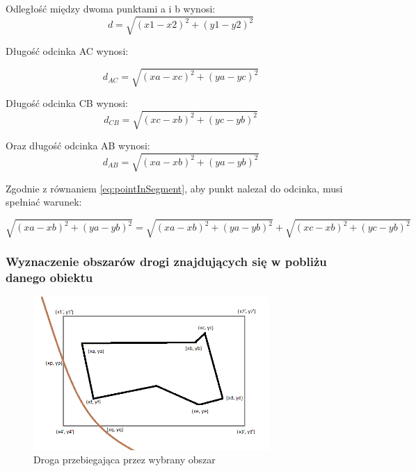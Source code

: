 Odległość między dwoma punktami a i b wynosi:
\begin{equation} \label{eq:distanceBetweenTwoPoint}
d = \sqrt{(x1 - x2)^2 + (y1 - y2)^2}
\end{equation}\newline

Długość odcinka AC wynosi:

\begin{equation} \label{eq:distanceBetweenTwoPointAC}
d_{AC} = \sqrt{(xa - xc)^2 + (ya - yc)^2}
\end{equation}\newline

Długość odcinka CB wynosi:
\begin{equation} \label{eq:distanceBetweenTwoPointCB}
d_{CB} = \sqrt{(xc - xb)^2 + (yc - yb)^2}
\end{equation}\newline

Oraz długość odcinka AB wynosi:
\begin{equation} \label{eq:distanceBetweenTwoPointAB}
d_{AB} = \sqrt{(xa - xb)^2 + (ya - yb)^2}
\end{equation}\newline

Zgodnie z równaniem \ref{eq:pointInSegment}, aby punkt nalezał do odcinka, musi spełniać warunek:

\begin{equation} \label{eq:distanceBetweenTwoPointAB}
\sqrt{(xa - xb)^2 + (ya - yb)^2} = \sqrt{(xa - xb)^2 + (ya - yb)^2} + \sqrt{(xc - xb)^2 + (yc - yb)^2}
\end{equation}\newline

\subsubsection{Wyznaczenie obszarów drogi znajdujących się w pobliżu danego obiektu}



\newpage
\begin{figure}[h]
\label{sec:fourthBB}
\caption{Droga przebiegająca przez wybrany obszar}
\centering
\includegraphics[width=0.8\textwidth]{minBoundingBoxWay}
\end{figure}

